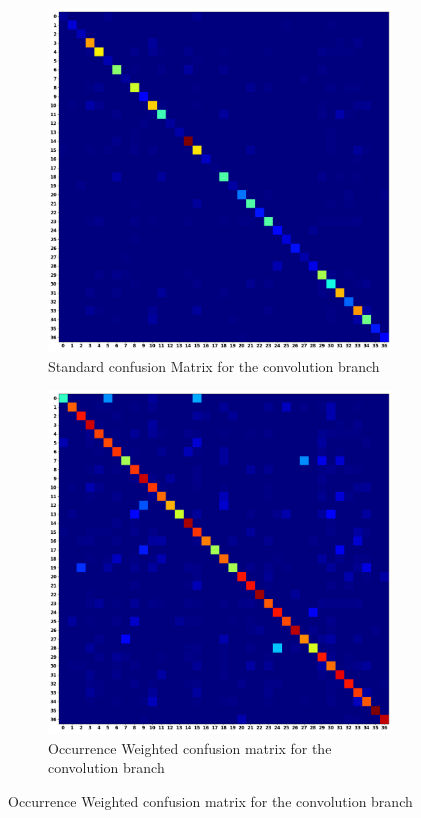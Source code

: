 \documentclass[12pt,letterpaper]{article}
\begin{document}
\begin{figure}[H]
	\begin{subfigure}[b]{0.45\textwidth}
	\centering
	\includegraphics[scale=0.18]{../FiguresMetrics/XValGammaCNN_Avg_Standard_Confusion}
	\caption{Standard confusion Matrix for the convolution branch}
	\end{subfigure}
	\hfill
	\begin{subfigure}[b]{0.45\textwidth}
	\centering
	\includegraphics[scale=0.18]{../FiguresMetrics/XValGammaCNN_Avg_Hits_Weighted_Confusion}
	\caption{Occurrence Weighted confusion matrix for the convolution branch}
	\end{subfigure}	


\end{figure}
\end{document}

